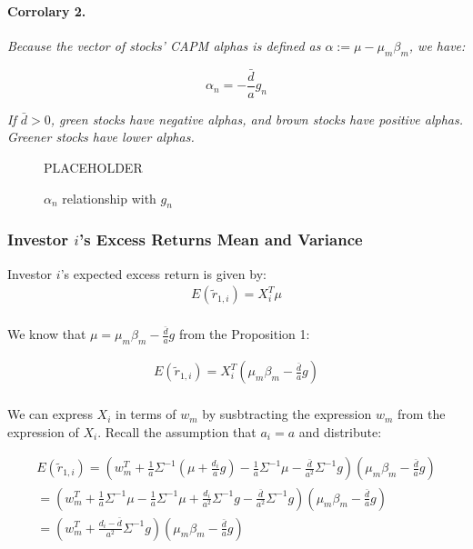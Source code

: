 \paragraph{Corrolary 2.} \textit{Because the vector of stocks' CAPM alphas is defined as 
$\alpha := \mu - \mu_m \beta_m$, we have:}

\begin{equation}
    \alpha_n = - \frac{\bar{d}}{a} g_n
\end{equation}

\textit{If $\bar{d} > 0$, green stocks have negative alphas, and brown stocks 
have positive alphas. Greener stocks have lower alphas.}


\begin{figure}
    \centering
    PLACEHOLDER
    \caption{$\alpha_n$ relationship with $g_n$}
    \label{fig:esg_returns}
\end{figure}

\subsubsection{Investor $i$'s Excess Returns Mean and Variance}

Investor $i$'s expected excess return is given by:
\begin{equation}
    \begin{aligned}
E(\tilde{r}_{1,i}) = X_i^T \mu \\ 
    \end{aligned}
\end{equation}

We know that $\mu = \mu_m \beta_m - \frac{\bar{d}}{a} g$ from the Proposition 1:

\begin{equation}
    \begin{aligned}
E(\tilde{r}_{1,i}) = X_i^T (\mu_m \beta_m - \frac{\bar{d}}{a} g) \\
    \end{aligned}
\end{equation}

We can express $X_i$ in terms of $w_m$ by susbtracting the expression $w_m$ 
from the expression of $X_i$. Recall the assumption that $a_i = a$ and distribute:

\begin{equation}
    \begin{aligned}
        E(\tilde{r}_{1,i}) = (w_m^T + \frac{1}{a} \Sigma^{-1} (\mu + \frac{d_i}{a}g) - \frac{1}{a} \Sigma^{-1} \mu - \frac{\bar{d}}{a^2} \Sigma^{-1} g) (\mu_m \beta_m - \frac{\bar{d}}{a} g) \\
        = (w_m^T + \frac{1}{a} \Sigma^{-1}\mu - \frac{1}{a} \Sigma^{-1} \mu + \frac{d_i}{a^2}\Sigma^{-1}g - \frac{\bar{d}}{a^2} \Sigma^{-1}g)(\mu_m \beta_m - \frac{\bar{d}}{a}g)\\
        = (w_m^T + \frac{d_i - \bar{d}}{a^2} \Sigma^{-1} g) (\mu_m \beta_m - \frac{\bar{d}}{a} g) \\
    \end{aligned}
\end{equation}

